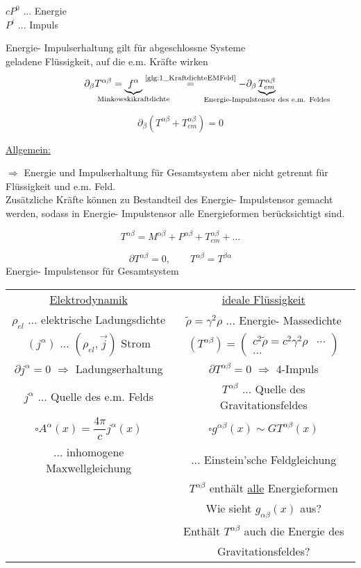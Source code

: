 \documentclass[a4paper, 11pt]{article}
\numberwithin{equation}{section}
\newcommand{\ubtext}[2]{\underbrace{#1}_{\mathclap{\text{#2}}}}
\begin{document}
$cP^0$ $...$ Energie\\
$P^i$ $...$ Impuls


Energie- Impulserhaltung gilt für abgeschlossne Systeme\\
geladene Flüssigkeit, auf die e.m. Kräfte wirken
\begin{equation}
\partial_\beta T^{\alpha \beta} = \ubtext{f^\alpha}{Minkowskikraftdichte} \overset{\text{\ref{glg:1_KraftdichteEMFeld}}}{=} - \partial_\beta \ubtext{T^{\alpha \beta}_{em}}{Energie-Impulstensor des e.m. Feldes}
\end{equation}

\begin{equation}
\partial_\beta \left( T^{\alpha \beta} + T^{\alpha \beta}_{em} \right) = 0
\end{equation}

\underline{Allgemein:}

$\Rightarrow$ Energie und Impulserhaltung für Gesamtsystem aber nicht getrennt für Flüssigkeit und e.m. Feld.\\
Zusätzliche Kräfte können zu Bestandteil des Energie- Impulstensor gemacht werden, sodass in Energie- Impulstensor alle Energieformen berücksichtigt sind.

\begin{equation}
T^{\alpha \beta} = M^{\alpha \beta} + P^{\alpha \beta} + T^{\alpha \beta}_{em} + ...
\end{equation}

\begin{equation}
\partial T^{\alpha \beta} = 0, \qquad T^{\alpha \beta} = T^{\beta \alpha}
\end{equation}
Energie- Impulstensor für Gesamtsystem


\begin{tabular}{c | c}
\underline{Elektrodynamik} 
& \underline{ideale Flüssigkeit} \\
$\rho_{el}$ $...$ elektrische Ladungsdichte 
& $\tilde{\rho} = \gamma^2 \rho$ $...$ Energie- Massedichte \\
$(j^\alpha)$ $...$ $( \rho_{el}, \vec{j} )$ Strom
& $\left( T^{\alpha \beta} \right) = \begin{pmatrix}
c^2 \tilde{\rho} = c^2 \gamma^2 \rho & \cdots \\ \hdots
\end{pmatrix}$ \\
$\partial j^\alpha = 0$ $\Rightarrow$ Ladungserhaltung
& $\partial T^{\alpha \beta} = 0$ $\Rightarrow$ 4-Impuls\\
$j^\alpha$ $...$ Quelle des e.m. Felds 
& $T^{\alpha \beta}$  $...$ Quelle des Gravitationsfeldes \\
$\square A^\alpha (x) = \dfrac{4 \pi}{c} j^\alpha (x)$ & 
 $\square g^{\alpha \beta}(x) \sim G T^{\alpha \beta}(x)$ \\
$...$ inhomogene Maxwellgleichung & $...$ Einstein'sche Feldgleichung \\
& $T^{\alpha \beta}$ enthält \underline{alle} Energieformen \\&
Wie sieht $g_{\alpha \beta}(x)$ aus? \\
& Enthält $T^{\alpha \beta}$ auch die Energie des \\& Gravitationsfeldes?
\end{tabular}
\end{document}

